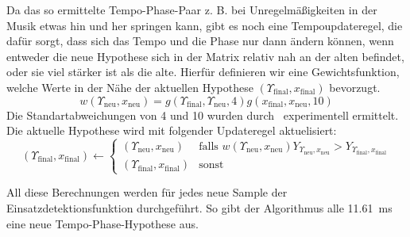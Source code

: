 {{{			%
			Da das so ermittelte Tempo-Phase-Paar  z. B. bei Unregelmäßigkeiten in der Musik etwas hin und her springen kann,
				gibt es noch eine Tempoupdateregel,
				die dafür sorgt,
				dass sich das Tempo und die Phase nur dann ändern können,
				wenn entweder die neue Hypothese sich in der Matrix relativ nah an der alten befindet,
				oder sie viel stärker ist als die alte.
			Hierfür definieren wir eine Gewichtsfunktion,
				welche Werte in der Nähe der aktuellen Hypothese $(\Upsilon_\text{final}, x_\text{final})$ bevorzugt.
			\begin{equation}
				w(\Upsilon_{\text{neu}}, x_{\text{neu}}) =
					g(\Upsilon_\text{final}, \Upsilon_{\text{neu}}, 4)
					g(x_\text{final}, x_{\text{neu}}, 10)
			\end{equation}
			Die Standartabweichungen von \num{4} und \num{10} wurden durch~\cite{2011_PlRoSt} experimentell ermittelt.
			Die aktuelle Hypothese wird mit folgender Updateregel aktuelisiert:
			\begin{equation}
				(\Upsilon_\text{final}, x_\text{final}) \leftarrow
				\begin{cases}
					(\Upsilon_{\text{neu}}, x_{\text{neu}}) &
						\text{falls } w(\Upsilon_{\text{neu}}, x_{\text{neu}}) Y_{\Upsilon_{\text{neu}}, x_{\text{neu}}} >
							Y_{\Upsilon_\text{final}, x_\text{final}} \\
					(\Upsilon_\text{final}, x_\text{final}) &
						\text{sonst}
				\end{cases}
			\end{equation}

			All diese Berechnungen werden für jedes neue Sample der Einsatzdetektionsfunktion durchgeführt.
			So gibt der Algorithmus alle \SI{11.61}{\milli\second} eine neue Tempo-Phase-Hypothese aus.
		}
	}
}
